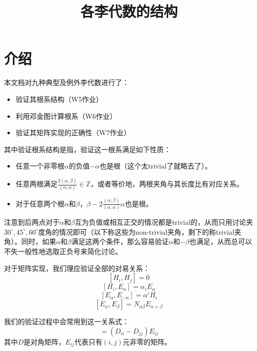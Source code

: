 \documentclass{ctexart}
\title{各李代数的结构}
\begin{document}
	\maketitle
	\tableofcontents
	\section{介绍}
	本文档对九种典型及例外李代数进行了：
	\begin{itemize}
		\item 验证其根系结构（W5作业）
		\item 利用邓金图计算根系（W6作业）
		\item 验证其矩阵实现的正确性（W7作业）
	\end{itemize}

	其中验证根系结构是指，验证这一根系满足如下性质：
	\begin{itemize}
		\item 任意一个非零根$\alpha$的负值$-\alpha$也是根（这个太trivial了就略去了）。
		\item 任意两根满足$\frac{2(\alpha,\beta)}{(\alpha,\alpha)}\in\mathbb Z$，或者等价地，两根夹角与其长度比有对应关系。
		\item 对于任意两个根$\alpha$和$\beta$，$\beta-2\frac{(\alpha,\beta)}{(\alpha,\alpha)}\alpha$也是根。
	\end{itemize}
	注意到后两点对于$\alpha$和$\beta$互为负值或相互正交的情况都是trivial的，从而只用讨论夹$30^\circ,45^\circ,60^\circ$度角的情况即可（以下称这些为non-trivial夹角，剩下的称trivial夹角）。同时，如果$\alpha$和$\beta$满足这两个条件，那么容易验证$\alpha$和$-\beta$也满足，从而总可以不失一般性地选取正负号来简化讨论。
	
	对于矩阵实现，我们理应验证全部的对易关系：
	\begin{equation}\label{HCommute}
	[H_i,H_j]=0
	\end{equation}
	\begin{equation}\label{HE}
	[H_i,E_\alpha]=\alpha_iE_\alpha
	\end{equation}
	\begin{equation}\label{Ean}
	[E_\alpha,E_{-\alpha}]=\alpha^iH_i
	\end{equation}
	\begin{equation}\label{Eab}
	[E_\alpha,E_\beta]=N_{\alpha\beta}E_{\alpha+\beta}
	\end{equation}
	
	我们的验证过程中会常用到这一关系式：
	\begin{equation}
	[D,E_{ij}]=(D_{ii}-D_{jj})E_{ij}
	\end{equation}
	其中$D$是对角矩阵，$E_{ij}$代表只有$(i,j)$元非零的矩阵。
	
\end{document}
